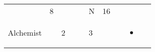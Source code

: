 \documentclass[12pt]{article}
\begin{document}
\begin{longtable}[]{@{}llllllllll@{}}
\begin{minipage}[t]{0.06\columnwidth}\raggedright\strut
\strut\end{minipage} &
\begin{minipage}[t]{0.06\columnwidth}\raggedright\strut
8
\strut\end{minipage} &
\begin{minipage}[t]{0.06\columnwidth}\raggedright\strut
\strut\end{minipage} &
\begin{minipage}[t]{0.06\columnwidth}\raggedright\strut
\strut\end{minipage} &
\begin{minipage}[t]{0.06\columnwidth}\raggedright\strut
\strut\end{minipage} &
\begin{minipage}[t]{0.07\columnwidth}\raggedright\strut
N
\strut\end{minipage} &
\begin{minipage}[t]{0.08\columnwidth}\raggedright\strut
16
\strut\end{minipage}\tabularnewline
\begin{minipage}[t]{0.13\columnwidth}\raggedright\strut
Alchemist
\strut\end{minipage} &
\begin{minipage}[t]{0.06\columnwidth}\raggedright\strut
\strut\end{minipage} &
\begin{minipage}[t]{0.06\columnwidth}\raggedright\strut
2
\strut\end{minipage} &
\begin{minipage}[t]{0.06\columnwidth}\raggedright\strut
\strut\end{minipage} &
\begin{minipage}[t]{0.06\columnwidth}\raggedright\strut
\strut\end{minipage} &
\begin{minipage}[t]{0.06\columnwidth}\raggedright\strut
3
\strut\end{minipage} &
\begin{minipage}[t]{0.06\columnwidth}\raggedright\strut
\strut\end{minipage} &
\begin{minipage}[t]{0.06\columnwidth}\raggedright\strut
\strut\end{minipage} &
\begin{minipage}[t]{0.07\columnwidth}\raggedright\strut
\begin{itemize}
\item

\end{itemize}
\end{minipage}
\end{longtable}
\end{document}
